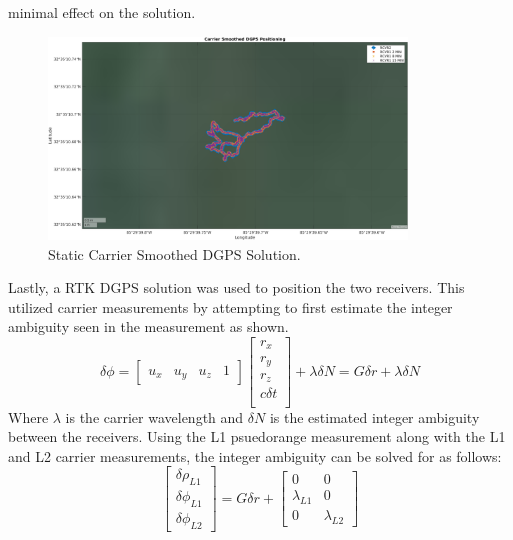 \documentclass[11pt]{article}
\begin{document}
\begin{enumerate}[label=\textbf{\arabic*.}]
    minimal effect on the solution.
    \begin{figure}[H]
      \centering
      \includegraphics[width=0.85\textwidth]{p2_c.png}
      \caption{Static Carrier Smoothed DGPS Solution.}
    \end{figure}
    Lastly, a RTK DGPS solution was used to position the two receivers. This utilized 
    carrier measurements by attempting to first estimate the integer ambiguity seen in 
    the measurement as shown.
    \begin{equation}
      \delta \phi = 
      \begin{bmatrix}
        u_x & u_y & u_z & 1
      \end{bmatrix}
      \begin{bmatrix}
        r_x \\ r_y \\ r_z \\ c \delta t \\
      \end{bmatrix}
      + \lambda \delta N
      = G \delta r + \lambda \delta N
    \end{equation}
    Where $\lambda$ is the carrier wavelength and $\delta N$ is the estimated integer 
    ambiguity between the receivers. Using the L1 psuedorange measurement along with 
    the L1 and L2 carrier measurements, the integer ambiguity can be solved for as 
    follows:
    \begin{equation}
      \begin{bmatrix}
        \delta \rho_{L1} \\ \delta \phi_{L1} \\ \delta \phi_{L2}
      \end{bmatrix}
      =
      G \delta r +
      \begin{bmatrix}
        0 & 0 \\ \lambda_{L1} & 0 \\ 0 & \lambda_{L2}

\end{bmatrix}
\end{equation}
\end{enumerate}
\end{document}
